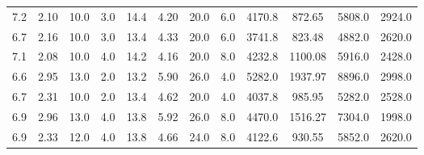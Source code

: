 \documentclass{article}
\begin{document}
\begin{table}[]
\begin{tabular}{cccccccccccc}
	     		7.2                        & 2.10                         & 10.0                     & 3.0                      & 14.4                      & 4.20                         & 20.0                     & 6.0                      & 4170.8                    & 872.65                       & 5808.0                   & 2924.0                   \\
	     		6.7                        & 2.16                         & 10.0                     & 3.0                      & 13.4                      & 4.33                         & 20.0                     & 6.0                      & 3741.8                    & 823.48                       & 4882.0                   & 2620.0                   \\
	     		7.1                        & 2.08                         & 10.0                     & 4.0                      & 14.2                      & 4.16                         & 20.0                     & 8.0                      & 4232.8                    & 1100.08                      & 5916.0                   & 2428.0                   \\
	     		6.6                        & 2.95                         & 13.0                     & 2.0                      & 13.2                      & 5.90                         & 26.0                     & 4.0                      & 5282.0                    & 1937.97                      & 8896.0                   & 2998.0                   \\
	     		6.7                        & 2.31                         & 10.0                     & 2.0                      & 13.4                      & 4.62                         & 20.0                     & 4.0                      & 4037.8                    & 985.95                       & 5282.0                   & 2528.0                   \\
	     		6.9                        & 2.96                         & 13.0                     & 4.0                      & 13.8                      & 5.92                         & 26.0                     & 8.0                      & 4470.0                    & 1516.27                      & 7304.0                   & 1998.0                   \\
	     		6.9                        & 2.33                         & 12.0                     & 4.0                      & 13.8                      & 4.66                         & 24.0                     & 8.0                      & 4122.6                    & 930.55                       & 5852.0                   & 2620.0                   \\

\end{tabular}
\end{table}
\end{document}
